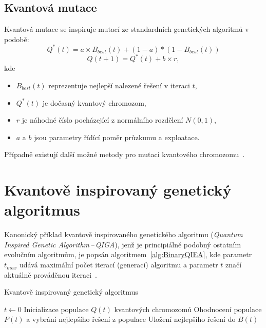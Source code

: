 \subsection{Kvantová mutace}\label{subsec:quantum-mutation}
Kvantová mutace se inspiruje mutací ze standardních genetických algoritmů v podobě:
\begin{equation*}
    Q^*\left(t\right) = a \times B_{best}\left(t\right) + (1 - a) * (1 - B_{best}\left(t\right))
\end{equation*}
\begin{equation*}
    Q(t+1) = Q^*\left(t\right) + b \times r,
\end{equation*}
kde
\begin{itemize}
    \item $B_{best}\left(t\right)$ reprezentuje nejlepší nalezené řešení v iteraci $t$,
    \item $Q^*\left(t\right)$ je dočasný kvantový chromozom,
    \item $r$ je náhodné číslo pocházející z normálního rozdělení $N(0,1)$,
    \item $a$ a $b$ jsou parametry řídící poměr průzkumu a exploatace.
\end{itemize}
Případně existují další možné metody pro mutaci kvantového chromozomu~\cite{NaturalComputing}.

\section{Kvantově inspirovaný genetický algoritmus}\label{sec:qiga}
Kanonický příklad kvantově inspirovaného genetického algoritmu (\emph{Quantum Inspired Genetic Algorithm\,--\,QIGA}), jenž je principiálně podobný ostatním evolučním algoritmům, je popsán algoritmem~\ref{alg:BinaryQIEA}, kde parametr $t_{max}$ udává maximální počet iterací (generací) algoritmu a parametr $t$ značí aktuálně prováděnou iteraci~\cite{NaturalComputing}. 

\begin{algorithm}[ht]
    \caption{Kvantově inspirovaný genetický algoritmus~\cite{NaturalComputing}}
    \label{alg:BinaryQIEA}
    $t \gets 0$\;
    Inicializace populace $Q\left(t\right)$ kvantových chromozomů\;
    Ohodnocení populace $P\left(t\right)$ a vybrání nejlepšího řešení z populace\;
    Uložení nejlepšího řešení do $B\left(t\right)$\;
\end{algorithm}

